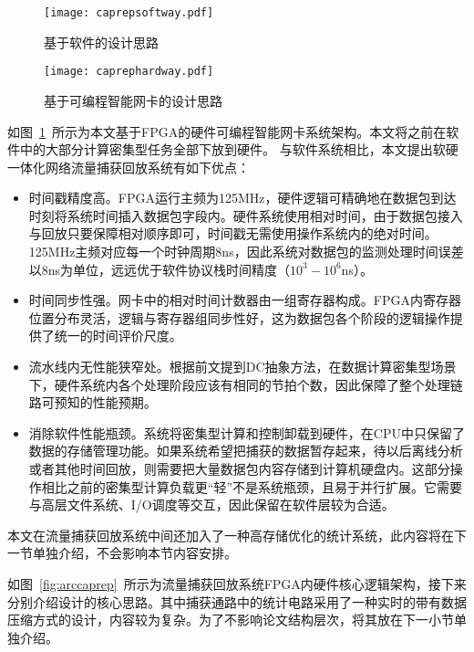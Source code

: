 \begin{figure}[htbp]
	\centering 
	\vspace{-1.5mm}
	\begin{minipage}[t]{0.48\textwidth}
		\centering
		\texttt{[image: caprepsoftway.pdf]}
		\caption{基于软件的设计思路} \label{fig:caprepsoftway}
	\end{minipage}
	\begin{minipage}[t]{0.48\textwidth}
		\centering
		\texttt{[image: caprephardway.pdf]}
		\caption{基于可编程智能网卡的设计思路} \label{fig:caprephardway}
	\end{minipage}
\end{figure}

如图~\ref{fig:caprephardway}~所示为本文基于FPGA的硬件可编程智能网卡系统架构。本文将之前在软件中的大部分计算密集型任务全部下放到硬件。 与软件系统相比，本文提出软硬一体化网络流量捕获回放系统有如下优点：

\begin{itemize}
	\item 时间戳精度高。FPGA运行主频为125MHz，硬件逻辑可精确地在数据包到达时刻将系统时间插入数据包字段内。硬件系统使用相对时间，由于数据包接入与回放只要保障相对顺序即可，时间戳无需使用操作系统内的绝对时间。125MHz主频对应每一个时钟周期8ns，因此系统对数据包的监测处理时间误差以8ns为单位，远远优于软件协议栈时间精度（$10^3-10^6$ns）。
	\item 时间同步性强。网卡中的相对时间计数器由一组寄存器构成。FPGA内寄存器位置分布灵活，逻辑与寄存器组同步性好，这为数据包各个阶段的逻辑操作提供了统一的时间评价尺度。
	\item 流水线内无性能狭窄处。根据前文提到DC抽象方法，在数据计算密集型场景下，硬件系统内各个处理阶段应该有相同的节拍个数，因此保障了整个处理链路可预知的性能预期。
	\item 消除软件性能瓶颈。系统将密集型计算和控制卸载到硬件，在CPU中只保留了数据的存储管理功能。如果系统希望把捕获的数据暂存起来，待以后离线分析或者其他时间回放，则需要把大量数据包内容存储到计算机硬盘内。这部分操作相比之前的密集型计算负载更“轻”不是系统瓶颈，且易于并行扩展。它需要与高层文件系统、I/O调度等交互，因此保留在软件层较为合适。
\end{itemize}

本文在流量捕获回放系统中间还加入了一种高存储优化的统计系统，此内容将在下一节单独介绍，不会影响本节内容安排。

\label{chap344}

如图~\ref{fig:arccaprep}~所示为流量捕获回放系统FPGA内硬件核心逻辑架构，接下来分别介绍设计的核心思路。其中捕获通路中的统计电路采用了一种实时的带有数据压缩方式的设计，内容较为复杂。为了不影响论文结构层次，将其放在下一小节单独介绍。

